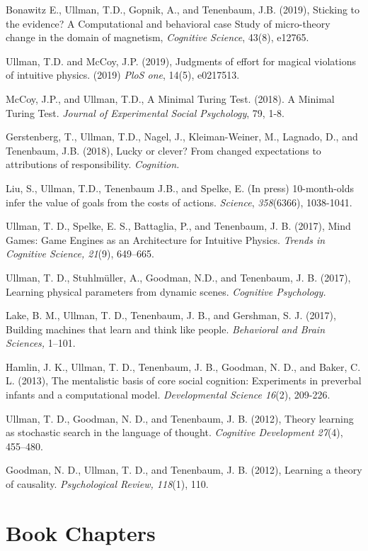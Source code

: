 \documentclass[margin,line,pifont,palatino,courier]{res}
\begin{document}
\begin{resume}
Bonawitz E., Ullman, T.D., Gopnik, A., and Tenenbaum, J.B. (2019), Sticking to the evidence? A Computational and behavioral case Study of micro-theory change in the domain of magnetism, \textit{Cognitive Science}, 43(8), e12765.

Ullman, T.D. and McCoy, J.P. (2019), Judgments of effort for magical violations of intuitive physics. (2019) \textit{PloS one}, 14(5), e0217513.

McCoy, J.P., and Ullman, T.D., A Minimal Turing Test. (2018). A Minimal Turing Test. \textit{Journal of Experimental Social Psychology}, 79, 1-8.

Gerstenberg, T., Ullman, T.D., Nagel, J., Kleiman-Weiner, M., Lagnado, D., and Tenenbaum, J.B. (2018), Lucky or clever? From changed expectations to attributions of responsibility. \textit{Cognition.}

Liu, S., Ullman, T.D., Tenenbaum J.B., and Spelke, E. (In press) 10-month-olds infer the value of goals from the costs of actions. \textit{Science}, \textit{358}(6366), 1038-1041.

Ullman, T. D., Spelke, E. S., Battaglia, P., and Tenenbaum, J. B. (2017), Mind Games: Game Engines as an Architecture for Intuitive Physics. \textit{Trends in Cognitive Science, 21}(9), 649--665.

Ullman, T. D., Stuhlm{\"u}ller, A., Goodman, N.D., and Tenenbaum, J. B. (2017), Learning physical parameters from dynamic scenes. \textit{Cognitive Psychology.}

Lake, B. M., Ullman, T. D., Tenenbaum, J. B., and Gershman, S. J. (2017), Building machines that learn and think like people. \textit{Behavioral and Brain Sciences,} 1--101.

Hamlin, J. K., Ullman, T. D., Tenenbaum, J. B., Goodman, N. D., and Baker, C. L. (2013), The mentalistic basis of core social cognition: Experiments in preverbal infants and a computational model. \textit{Developmental Science 16}(2), 209-226.

Ullman, T. D., Goodman, N. D., and Tenenbaum, J. B. (2012), Theory learning as stochastic search in the language of thought. \textit{Cognitive Development 27}(4), 455--480.

Goodman, N. D., Ullman, T. D., and Tenenbaum, J. B. (2012), Learning a theory of causality. \textit{Psychological Review, 118}(1), 110. 

\section{\sc Book Chapters}


\end{resume}
\end{document}
